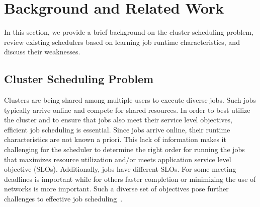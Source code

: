 \section{Background and Related Work}
\label{sec:back}

In this section, we provide a brief background on the cluster scheduling problem,
review existing schedulers based on learning job runtime characteristics, and
discuss their weaknesses.

\subsection{Cluster Scheduling Problem}
\label{sec:back:problem}



Clusters are being shared among multiple users to execute diverse jobs. Such
jobs typically arrive online and compete for shared resources. In order to best
utilize the cluster and to ensure that jobs also meet their service level
objectives, efficient job scheduling is essential. Since jobs arrive online,
their runtime characteristics are not known a priori. This lack of information
makes it challenging for the scheduler to determine the right order for running
the jobs that maximizes resource utilization and/or meets application service
level objective (SLOs). Additionally, jobs have different SLOs. For some
meeting deadlines is important while for others faster completion or minimizing
the use of networks is more important. Such a diverse set of objectives pose
further challenges to effective job
scheduling~\cite{drf:nsdi11,jockey:eurosys2012, shufflewatcher, corral,
morpheus, delay:eurosys10, cdef:atc18}.

